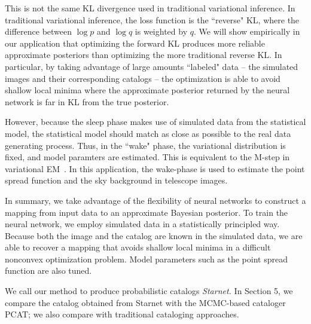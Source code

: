 This is not the same KL divergence used in traditional variational inference. In traditional variational inference, the loss function is the ``reverse" KL, where the difference between $\log p$ and $\log q$ is weighted by $q$. We will show empirically in our application that optimizing the forward KL produces more reliable approximate posteriors than optimizing the more traditional reverse KL. In particular, by taking advantage of large amounts ``labeled" data -- the simulated images and their corresponding catalogs -- the optimization is able to avoid shallow local minima where the approximate posterior returned by the neural network is far in KL from the true posterior. 

However, because the sleep phase makes use of simulated data from the statistical model, the statistical model should match as close as possible to the real data generating process. 
Thus, in the ``wake" phase, the variational distribution is fixed, and model paramters are estimated. This is equivalent to the M-step in variational EM~\cite{Jordan_intro_vi, neal2000varem, Beal2002varem}. In this application, the wake-phase is used to estimate the point spread function and the sky background in telescope images. 

In summary, we take advantage of the flexibility of neural networks to construct a mapping from input data to an approximate Bayesian posterior. To train the neural network, we employ simulated data in a statistically principled way. Because both the image and the catalog are known in the simulated data, we are able to recover a mapping that avoids shallow local minima in a difficult nonconvex optimization problem. Model parameters such as the point spread function are also tuned. 

We call our method to produce probabilistic catalogs {\itshape Starnet.}
In Section 5, we compare
the catalog obtained from Starnet with the MCMC-based cataloger PCAT;
we also compare with traditional cataloging approaches.






